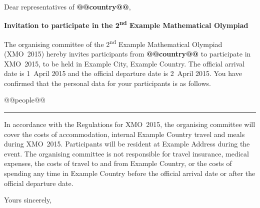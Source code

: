 \documentclass[a4paper]{letter}
\begin{document}
\address{Example Mathematical Olympiad \\
  Example Address}
\signature{Example Signature}
\begin{letter}{}

\opening{Dear representatives of \textbf{@@country@@},}

\begin{center}
\textbf{Invitation to participate in the 2\textsuperscript{nd} Example
  Mathematical Olympiad}
\end{center}

The organising committee of the 2\textsuperscript{nd} Example
Mathematical Olympiad (XMO~2015) hereby invites participants from
\textbf{@@country@@} to participate in XMO~2015, to be held in Example
City, Example Country.  The official arrival date is 1~April 2015 and
the official departure date is 2~April 2015.  You have confirmed that
the personal data for your participants is as follows.

@@people@@
\vspace{5pt}
\hrule
\vspace{5pt}

In accordance with the Regulations for XMO~2015, the organising
committee will cover the costs of accommodation, internal Example
Country travel and meals during XMO~2015.  Participants will be
resident at Example Address during the event.  The organising
committee is not responsible for travel insurance, medical expenses,
the costs of travel to and from Example Country, or the costs of
spending any time in Example Country before the official arrival date
or after the official departure date.

\closing{Yours sincerely,}

\end{letter}
\end{document}
